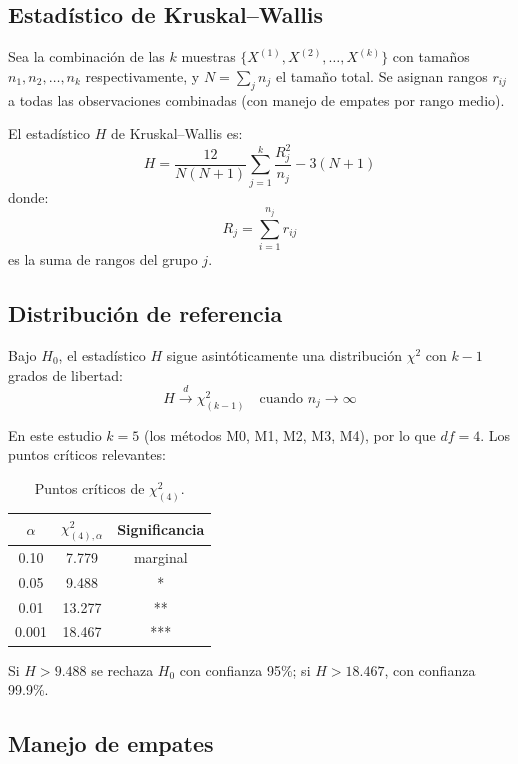 \documentclass[12pt,a4paper,oneside]{book}
\begin{document}
\subsection{Estadístico de Kruskal--Wallis}

Sea la combinación de las $k$ muestras $\{X^{(1)}, X^{(2)}, \ldots, X^{(k)}\}$ con tamaños $n_1, n_2, \ldots, n_k$ respectivamente, y $N = \sum_j n_j$ el tamaño total. Se asignan rangos $r_{ij}$ a todas las observaciones combinadas (con manejo de empates por rango medio).

El estadístico $H$ de Kruskal--Wallis es:
\begin{equation}
\boxed{H = \frac{12}{N(N+1)} \sum_{j=1}^{k} \frac{R_j^2}{n_j} - 3(N+1)}
\label{doc2:eq:H}
\end{equation}
donde:
\begin{equation}
R_j = \sum_{i=1}^{n_j} r_{ij}
\end{equation}
es la suma de rangos del grupo $j$.

\subsection{Distribución de referencia}

Bajo $H_0$, el estadístico $H$ sigue asintóticamente una distribución $\chi^2$ con $k-1$ grados de libertad:
\begin{equation}
H \xrightarrow{d} \chi^2_{(k-1)} \quad \text{cuando } n_j \to \infty
\end{equation}

En este estudio $k=5$ (los métodos M0, M1, M2, M3, M4), por lo que $df = 4$. Los puntos críticos relevantes:

\begin{table}[H]
\centering
\caption{Puntos críticos de $\chi^2_{(4)}$.}
\begin{tabular}{ccc}
\toprule
$\alpha$ & $\chi^2_{(4),\alpha}$ & Significancia \\
\midrule
0.10  & 7.779  & marginal \\
0.05  & 9.488  & * \\
0.01  & 13.277 & ** \\
0.001 & 18.467 & *** \\
\bottomrule
\end{tabular}
\end{table}

Si $H > 9.488$ se rechaza $H_0$ con confianza 95\%; si $H > 18.467$, con confianza 99.9\%.

\subsection{Manejo de empates}
\end{document}
